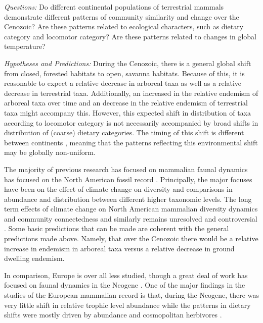 \documentclass[12pt,letterpaper]{article}
\begin{document}
\textit{Questions:} Do different continental populations of terrestrial mammals demonstrate different patterns of community similarity and change over the Cenozoic? Are these patterns related to ecological characters, such as dietary category and locomotor category? Are these patterns related to changes in global temperature?

\textit{Hypotheses and Predictions:}
During the Cenozoic, there is a general global shift from closed, forested habitats to open, savanna habitats. Because of this, it is reasonable to expect a relative decrease in arboreal taxa as well as a relative decrease in terrestrial taxa. Additionally, an increased in the relative endemism of arboreal taxa over time and an decrease in the relative endemism of terrestrial taxa might accompany this. However, this expected shift in distribution of taxa according to locomotor category is not necessarily accompanied by broad shifts in distribution of (coarse) dietary categories. The timing of this shift is different between continents \citep{Stromberg2005,Stromberg2013}, meaning that the patterns reflecting this environmental shift may be globally non-uniform.

The majority of previous research has focused on mammalian faunal dynamics has focused on the North American fossil record \citep{Alroy2000g,Alroy1996a,Alroy1998,Barnosky2001a,Simpson1944,Simpson1953,Badgley2013,Blois2009,Figueirido2012,Gunnell1995,Hadly2001}. Principally, the major focuses have been on the effect of climate change on diversity and comparisons in abundance and distribution between different higher taxonomic levels. The long term effects of climate change on North American mammalian diversity dynamics and community connectedness and similarly remains unresolved and controversial \citep{Alroy2000g,Blois2009,Figueirido2012,Barnosky2001a}. Some basic predictions that can be made are coherent with the general predictions made above. Namely, that over the Cenozoic there would be a relative increase in endemism in arboreal taxa versus a relative decrease in ground dwelling endemism.

In comparison, Europe is over all less studied, though a great deal of work has focused on faunal dynamics in the Neogene \citep{Jernvall2002,Jernvall2004,Liow2008,Raia2006,Raia2005,Raia2011c}. One of the major findings in the studies of the European mammalian record is that, during the Neogene, there was very little shift in relative trophic level abundance \citep{Jernvall2004} while the patterns in dietary shifts were mostly driven by abundance and cosmopolitan herbivores \citep{Jernvall2002}.
\end{document}
